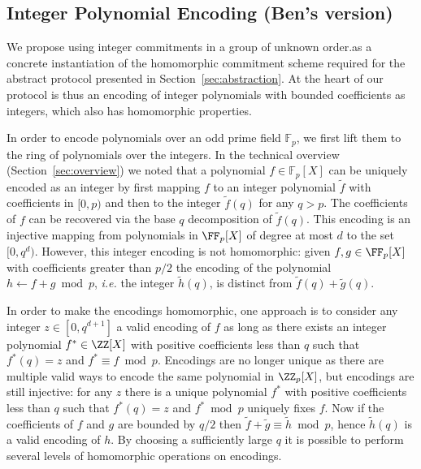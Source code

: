 \subsection{Integer Polynomial Encoding (Ben's version)}
\label{sec:encoding}
We propose using integer commitments in a group of unknown order.as a concrete instantiation of the homomorphic commitment scheme required for the abstract protocol presented in Section~\ref{sec:abstraction}. At the heart of our protocol is thus an encoding of integer polynomials with bounded coefficients as integers, which also has homomorphic properties. 

In order to encode polynomials over an odd prime field $\mathbb{F}_p$, we first lift them to the ring of polynomials over the integers. In the technical overview (Section~\ref{sec:overview}) we noted that a polynomial $f \in \mathbb{F}_p[X]$ can be uniquely encoded as an integer by first mapping $f$ to an integer polynomial $\tilde{f}$ with coefficients in $[0, p)$ and then to the integer $\tilde{f}(q)$ for any $q > p$. 
The coefficients of $f$ can be recovered via the base $q$ decomposition of $\tilde{f}(q)$. 
This encoding is an injective mapping from polynomials in $\FF_p[X]$ of degree at most $d$ to the set $[0, q^d)$. However, this integer encoding is not homomorphic: given $f, g \in \FF_p[X]$ with coefficients greater than $p/2$ the encoding of the polynomial $h \leftarrow f + g \bmod p$, \emph{i.e.} the integer $\tilde{h}(q)$, is distinct from $\tilde{f}(q) + \tilde{g}(q)$. 

In order to make the encodings homomorphic, one approach is to consider any integer $z \in [0, q^{d+1}] $ a valid encoding of $f$ as long as there exists an integer polynomial $f^* \in \ZZ[X]$ with positive coefficients less than $q$ such that $f^*(q) = z$ and $f^* \equiv f \bmod p$. Encodings are no longer unique as there are multiple valid ways to encode the same polynomial in $\ZZ_p[X]$, but encodings are still injective: for any $z$ there is a unique polynomial $f^*$ with positive coefficients less than $q$ such that $f^*(q) = z$ and $f^* \bmod p$ uniquely fixes $f$. 
 Now if the coefficients of $f$ and $g$ are bounded by $q/2$ then $\tilde{f} + \tilde{g} \equiv \tilde{h} \bmod p$, hence $\tilde{h}(q)$ is a valid encoding of $h$. By choosing a sufficiently large $q$ it is possible to perform several levels of homomorphic operations on encodings. 
 

